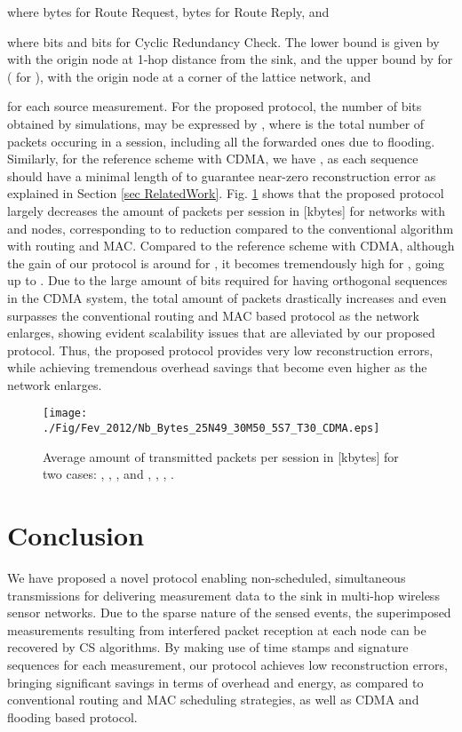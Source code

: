 \documentclass[letterpaper,conference]{IEEEtran}
\begin{document}
where  bytes for Route Request,  bytes for Route Reply, and
 
where  bits and  bits for Cyclic Redundancy Check. The lower bound  is given by  with the origin node at 1-hop distance from the sink, and the upper bound  by  for  ( for ), with the origin node at a corner of the lattice network, and


for each source measurement.
For the proposed protocol, the number of bits obtained by simulations, may be expressed by , where  is the total number of packets occuring in a session, including all the forwarded ones due to flooding.
Similarly, for the reference scheme with CDMA, we have , as each sequence should have a minimal length of  to guarantee near-zero reconstruction error as explained in Section \ref{sec RelatedWork}.
Fig. \ref{fig:Bits} shows that the proposed protocol largely decreases the amount of packets per session in [kbytes] for networks with  and  nodes, corresponding to  to  reduction compared to the conventional algorithm with routing and MAC.
Compared to the reference scheme with CDMA, although the gain of our protocol is around  for , it becomes tremendously high for , going up to . Due to the large amount of bits required for having orthogonal sequences in the CDMA system, the total amount of packets drastically increases and even surpasses the conventional routing and MAC based protocol as the network enlarges, showing evident scalability issues that are alleviated by our proposed protocol.
Thus, the proposed protocol provides very low reconstruction errors, while achieving tremendous overhead savings that become even higher as the network enlarges.




\begin{figure}[h]
\begin{center}
   \texttt{[image: ./Fig/Fev\_2012/Nb\_Bytes\_25N49\_30M50\_5S7\_T30\_CDMA.eps]} \caption{Average amount of transmitted packets per session in [kbytes] for two cases: , , ,  and , , , .}
\label{fig:Bits}
\end{center}
\vspace{-0.6cm}
\end{figure}



\section{Conclusion}

We have proposed a novel protocol enabling non-scheduled, simultaneous transmissions for delivering measurement data to the sink in multi-hop wireless sensor networks.
Due to the sparse nature of the sensed events, the superimposed measurements resulting from interfered packet reception at each node can be recovered by CS algorithms. By making use of time stamps and signature sequences for each measurement, our protocol achieves low reconstruction errors, bringing significant savings in terms of overhead and energy, as compared to conventional routing and MAC scheduling strategies, as well as CDMA and flooding based protocol.
\end{document}
